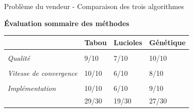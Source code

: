 \documentclass{beamer}
\begin{document}
\begin{frame}{Problème du vendeur - Comparaison des trois algorithmes}
  \begin{center}\textbf{Évaluation sommaire des méthodes}\end{center}
  \begin{table}
  \centering
  \begin{tabular}{C{2.6cm}C{2cm}C{2cm}C{2cm}}
  &\textbf{Tabou} & \textbf{Lucioles} & \textbf{Génétique}\\
  \hline\\
  \textit{Qualité} & 9/10 & 7/10 & 10/10\\\\
  \textit{Vitesse de convergence} & 10/10 & 6/10 & 8/10\\\\
   \textit{Implémentation} & 10/10 & 6/10 & 9/10 \\
   \hline
      &29/30 & 19/30 & 27/30\\
  \end{tabular}
\end{table}
\end{frame}
\end{document}
